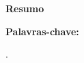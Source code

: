 \vspace{1cm}
\begin{center}
{\fontsize{14}{16}\selectfont\bfseries \MakeUppercase
\TituloCompletoArtigo
\par}

\vspace{12pt}
{\fontsize{10}{12}\selectfont \bfseries 
\AutoresFiliacoesArtigo
\par}

\vspace{2mm}
{\fontsize{10}{11}\selectfont 
\FiliacoesArtigo
\par}
\end{center}
		{\fontsize{11}{13}\selectfont 
		\textbf{Resumo}
		\vspace{-2mm}
		
		\ResumoArtigo
		\par}
		\vspace{0.1\baselineskip} \fontsize{11}{13}\selectfont 
		\textbf{Palavras-chave: }{\fontsize{11}{13}\selectfont 
		\PalavrasChaveArtigo.
		\par}
